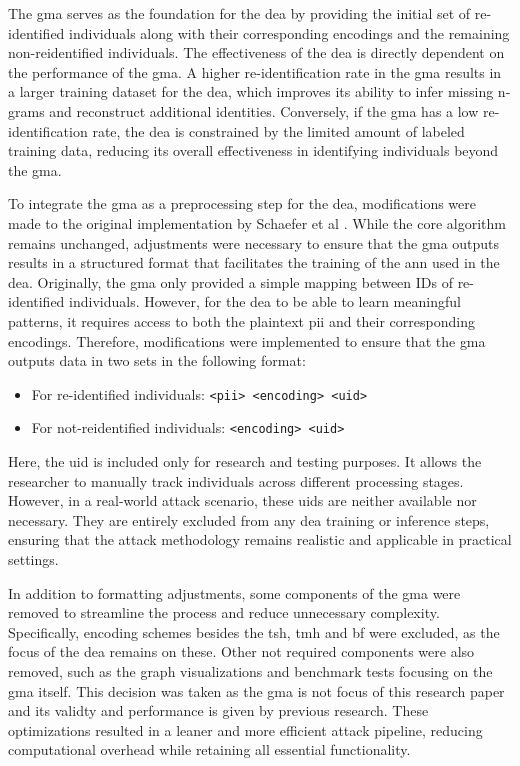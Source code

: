 The \ac{gma} serves as the foundation for the \ac{dea} by providing the initial set of re-identified individuals along with their corresponding encodings and the remaining non-reidentified individuals.
The effectiveness of the \ac{dea} is directly dependent on the performance of the \ac{gma}.
A higher re-identification rate in the \ac{gma} results in a larger training dataset for the \ac{dea}, which improves its ability to infer missing n-grams and reconstruct additional identities.
Conversely, if the \ac{gma} has a low re-identification rate, the \ac{dea} is constrained by the limited amount of labeled training data, reducing its overall effectiveness in identifying individuals beyond the \ac{gma}.

To integrate the \ac{gma} as a preprocessing step for the \ac{dea}, modifications were made to the original implementation by Schaefer et al \cite{schaefer2024}.
While the core algorithm remains unchanged, adjustments were necessary to ensure that the \ac{gma} outputs results in a structured format that facilitates the training of the \ac{ann} used in the \ac{dea}.
Originally, the \ac{gma} only provided a simple mapping between IDs of re-identified individuals.
However, for the \ac{dea} to be able to learn meaningful patterns, it requires access to both the plaintext \ac{pii} and their corresponding encodings.
Therefore, modifications were implemented to ensure that the \ac{gma} outputs data in two sets in the following format:

\begin{itemize}
    \item For re-identified individuals: \texttt{<\ac{pii}> <encoding> <uid>}
    \item For not-reidentified individuals: \texttt{<encoding> <uid>}
\end{itemize}

Here, the uid is included only for research and testing purposes.
It allows the researcher to manually track individuals across different processing stages.
However, in a real-world attack scenario, these uids are neither available nor necessary.
They are entirely excluded from any \ac{dea} training or inference steps, ensuring that the attack methodology remains realistic and applicable in practical settings.

In addition to formatting adjustments, some components of the \ac{gma} were removed to streamline the process and reduce unnecessary complexity.
Specifically, encoding schemes besides the \ac{tsh}, \ac{tmh} and \ac{bf} were excluded, as the focus of the \ac{dea} remains on these.
Other not required components were also removed, such as the graph visualizations and benchmark tests focusing on the \ac{gma} itself.
This decision was taken as the \ac{gma} is not focus of this research paper and its validty and performance is given by previous research.
These optimizations resulted in a leaner and more efficient attack pipeline, reducing computational overhead while retaining all essential functionality.

